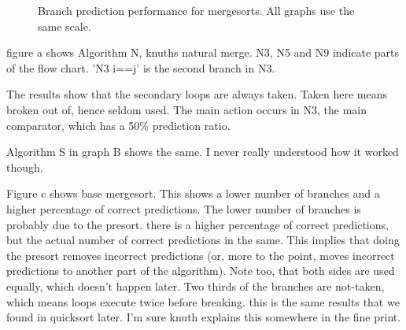 {\begin{figure}[H]
\begin{changemargin}
\end{changemargin}
\vspace*{6em}
\caption{Branch prediction performance for mergesorts. All graphs use the same scale.}
\label{Branch prediction performance for mergesorts}
\end{figure}
\newpage
}


figure a shows Algorithm N, knuths natural merge. N3, N5 and N9 indicate parts of the flow chart. 'N3 i==j' is the second branch in N3.

The results show that the secondary loops are always taken. Taken here means broken out of, hence seldom used. The main action occurs in N3, the main comparator, which has a 50\% prediction ratio.

Algorithm S in graph B shows the same. I never really understood how it worked though.



Figure c shows base mergesort. This shows a lower number of branches and a higher percentage of correct predictions. The lower number of branches is probably due to the presort. there is a higher percentage of correct predictions, but the actual number of correct predictions in the same. This implies that doing the presort removes incorrect predictions (or, more to the point, moves incorrect predictions to another part of the algorithm). Note too, that both sides are used equally, which doesn't happen later. Two thirds of the branches are not-taken, which means loops execute twice before breaking. this is the same results that we found in quicksort later. I'm sure knuth explains this somewhere in the fine print.

